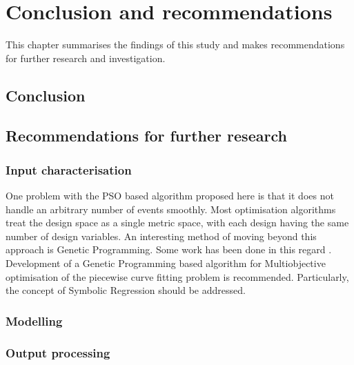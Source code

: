 \chapter{Conclusion and recommendations}\label{chap:conclusion}
\begin{overview}
  This chapter summarises the findings of this study and makes
  recommendations for further research and investigation.
\end{overview}

\section{Conclusion}

\section{Recommendations for further research}
\subsection{Input characterisation}
One problem with the PSO based algorithm proposed here is that it does not handle an arbitrary number of events smoothly.  Most optimisation algorithms treat the design space as a single metric space, with each design having the same number of design variables.  An interesting method of moving beyond this approach is Genetic Programming.  Some work has been done in this regard \citehere.  Development of a Genetic Programming based algorithm for Multiobjective optimisation of the piecewise curve fitting problem is recommended.  Particularly, the concept of Symbolic Regression should be addressed.

\subsection{Modelling}

\subsection{Output processing}


